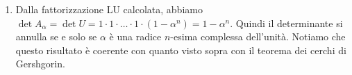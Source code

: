 \documentclass[a4paper]{report}
\theoremstyle{definition}
\theoremstyle{remark}
\begin{document}
\begin{enumerate}
\[\begin{bmatrix}
            0 & 1 & 0 & \dots & 0 & -\alpha^2\\
            0& 0 & 1 & \dots  & 0 & 0\\
            & & \ddots & \ddots\\
            & & & 0 & 1 & -\alpha^{n-1}\\
            & & &  &-\alpha & 1      
        \end{bmatrix},
        \quad
        U_n = \begin{bmatrix}
            1  & 0 &  0& \dots  & 0 &  -\alpha\\
            0 & 1 & 0 & \dots & 0 & -\alpha^2\\
            0& 0 & 1 & \dots  & 0 & 0\\
            & & \ddots & \ddots\\
            & & & -\alpha & 1 & -\alpha^{n-1}\\
            & & &  & 0 & 1-\alpha^n
        \end{bmatrix}.
    \]
    Quindi otteniamo la fattorizzazione $A=LU$ con
    \[
        L = \begin{bmatrix}
            1  & 0 &  0& \dots  & 0 &  0\\
            -\alpha & 1 & 0 & \dots & 0 & 0\\
            0& -\alpha & 1 & \dots  & 0 & 0\\
            & & -\alpha & 1\\
            & & & \ddots & \ddots & \\
            & & &  &-\alpha & 1      
        \end{bmatrix}, \quad U = \begin{bmatrix}
            1  & 0 &  0& \dots  & 0 &  -\alpha\\
            0 & 1 & 0 & \dots & 0 & -\alpha^2\\
            0& 0 & 1 & \dots  & 0 & 0\\
            & & \ddots & \ddots\\
            & & & 0 & 1 & -\alpha^{n-1}\\
            & & &  & 0 & 1-\alpha^n
        \end{bmatrix}.
    \]
    Ricordiamo che la matrice $L$ è ottenuta a partire dalla matrice identità inserendo sotto la diagonale tutti i moltiplicatori utilizzati nell'eliminazione.
    \item Dalla fattorizzazione LU calcolata, abbiamo $\det A_\alpha = \det U = 1\cdot 1 \cdot \dots \cdot 1 \cdot (1-\alpha^n) = 1-\alpha^n$. Quindi il determinante si annulla se e solo se $\alpha$ è una radice $n$-esima complessa dell'unità. Notiamo che questo risultato è coerente con quanto visto sopra con il teorema dei cerchi di Gershgorin.
\end{enumerate}
\end{document}
